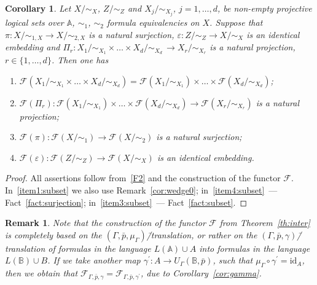 \documentclass[12pt]{article}
\newtheorem{corollary}{Corollary}
\newtheorem{remark}{Remark}
\theoremstyle{definition}
\def\MA{{\mathbb{A}}}
\def\MB{{\mathbb{B}}}
\def\F{{\mathcal{F}}}
\def\id{{\mathrm{id}}}
\begin{document}
\begin{corollary}\label{cor:functor_subset}
Let $X/{\sim_{X}}$, $Z/{\sim_Z}$ and $X_j/{\sim_{X_j}}$, $j=1,\ldots,d$, be non-empty projective logical sets over $\MA$, $\sim_{1}$, $\sim_{2}$ formula equivalencies on $X$. Suppose that $\pi\colon X/{\sim_{1,X}}\to X/{\sim_{2,X}}$ is a natural surjection, $\varepsilon\colon Z/{\sim_Z}\to X/{\sim_X}$ is an identical embedding and $\Pi_r\colon X_1/{\sim_{X_1}}\times\ldots\times X_d/{\sim_{X_d}}\,\to X_r/{\sim_{X_r}}$ is a natural projection, $r\in\{1,\ldots,d\}$. Then one has 
    \begin{enumerate}[label=(\roman*)]
            \item\label{item1:subset} $\F(X_1/{\sim_{{X_1}}}\times \ldots \times X_d/{\sim_{X_d}})=\F(X_1/{\sim_{X_1}})\times\ldots\times\F(X_d/{\sim_{X_d}})$;
        \item\label{item2:subset} $\F(\Pi_r)\colon \F(X_1/{\sim_{X_1}})\times\ldots\times\F(X_d/{\sim_{X_d}})\to \F(X_r/{\sim_{X_r}})$ is a natural projection;
        \item\label{item4:subset} $\F(\pi)\colon \F(X/{\sim_{1}})\to \F(X/{\sim_{2}})$ is a natural surjection;
        \item\label{item3:subset} $\F(\varepsilon)\colon \F(Z/{\sim_Z})\to\F(X/{\sim_X})$ is an identical embedding.
    \end{enumerate}
    
\end{corollary}

\begin{proof}
All assertions follow from~\ref{F2} and the construction of the functor $\F$. In~\ref{item1:subset} we also use Remark~\ref{cor:wedge0}; in~\ref{item4:subset}~--- Fact~\ref{fact:surjection}; in~\ref{item3:subset}~--- Fact~\ref{fact:subset}. 
\end{proof}

\begin{remark}\label{remark:gamma}
Note that the construction of the functor $\F$ from Theorem~\ref{th:inter} is completely based on the $(\Gamma,\bar p,\mu_\Gamma)$\=/translation, or rather on the
$(\Gamma,\bar p,\gamma)$\=/translation of formulas in the language $L(\MA)\cup A$ into formulas in the language $L(\MB)\cup B$. If we take another map $\gamma^\prime\colon A\to U_\Gamma(\MB,\bar p)$, such that $\mu_\Gamma\circ\gamma^\prime=\id_A$, then we obtain that $\F_{\Gamma,\bar p,\gamma}=\F_{\Gamma,\bar p,\gamma^\prime}$, due to Corollary~\ref{cor:gamma}.
\end{remark}
\end{document}
